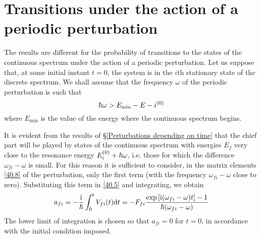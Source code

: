 \section{Transitions under the action of a periodic perturbation}\label{Transitions under the action of a periodic perturbation}
The results are different for the probability of transitions to the states of the continuous spectrum under the action of a periodic perturbation. Let us suppose that, at some initial instant $ t = 0 $, the system is in the $ i $th stationary state of the discrete spectrum. We shall assume that the frequency $\omega$ of the periodic perturbation is such that
\begin{equation}\label{42.1}
\hbar\omega>E_{\mathrm{min}}-E-i^{(0)}
\end{equation}
where $ E_{\mathrm{min}} $ is the value of the energy where the continuous spectrum begins.

It is evident from the results of \S\ref{Perturbations depending on time} that the chief part will be played by states of the continuous spectrum with energies $ E_f $ very close to the resonance energy $ E_i^{(0)} +\hbar\omega  $, i.e. those for which the difference $ \omega_{fi} -\omega $ is small. For this reason it is sufficient to consider, in the matrix elements \eqref{40.8} of the perturbation, only the first term (with the frequency $ \omega_{fi}-\omega $ close to zero). Substituting this term in \eqref{40.5} and integrating, we obtain
\begin{equation}\label{42.2}
a_{fi}=-\frac{\mathrm{i}}{\hbar}\int_0^tV_{fi}(t)\mathrm{d} t=-F_{fi}\frac{\exp\left[ \mathrm{i}(\omega_{fi}-\omega)t\right]-1}{\hbar(\omega_{fi}-\omega)}
\end{equation}
The lower limit of integration is chosen so that $ a_{fi} = 0 $ for $ t = 0 $, in accordance with the initial condition imposed.


